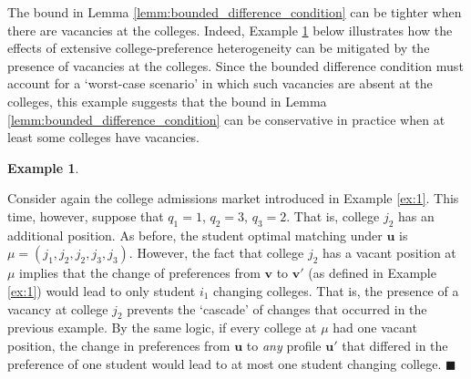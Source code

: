 \documentclass[12pt, fullpage]{amsart}
\makeatletter
\def\subsection{\@startsection{subsection}{2}
	\z@{.5\linespacing\@plus.7\linespacing}{.7\linespacing}{\large}}
\theoremstyle{definition}
\theoremstyle{definition}
\theoremstyle{definition}
\newtheorem{example}{Example}[section]
\makeatother
\begin{document}
\begin{bibunit}[econometrica]
The bound in Lemma \ref{lemm:bounded_difference_condition} can be tighter when there are vacancies at the colleges. Indeed, Example \ref{ex:2} below illustrates how the effects of extensive college-preference heterogeneity can be mitigated by the presence of vacancies at the colleges. Since the bounded difference condition must account for a `worst-case scenario' in which such vacancies are absent at the colleges, this example suggests that the bound in Lemma \ref{lemm:bounded_difference_condition} can be conservative in practice when at least some colleges have vacancies. 

\begin{example}\label{ex:2}
	
	Consider again the college admissions market introduced in Example \ref{ex:1}.
	This time, however, suppose that $q_{1}=1$, $q_{2}=3$, $q_{3}=2$.
	That is, college $j_2$ has an additional position. As before, the student
	optimal matching under $\boldsymbol{u}$ is $\mu=(j_{1},j_{2},j_{2},j_{3},j_{3}).$ However, the fact that college $j_{2}$ has a vacant position at $\mu$ implies that the change of preferences from $\boldsymbol{v}$ to $\boldsymbol{v}'$  (as defined in Example \ref{ex:1}) would lead to only student $i_{1}$ changing colleges. That is, the presence of a vacancy at college $j_{2}$ prevents the `cascade' of changes that occurred in the
	previous example. By the same logic, if every college at $\mu$ had one vacant position, the change in preferences from $\boldsymbol{u}$ to \textit{any}  profile $\boldsymbol{u}'$ that differed in the preference of one student would lead to at most one student changing college. $\blacksquare$
	
\end{example}

\subsection{Examples}\label{subsec:Examples}


\end{bibunit}
\end{document}
